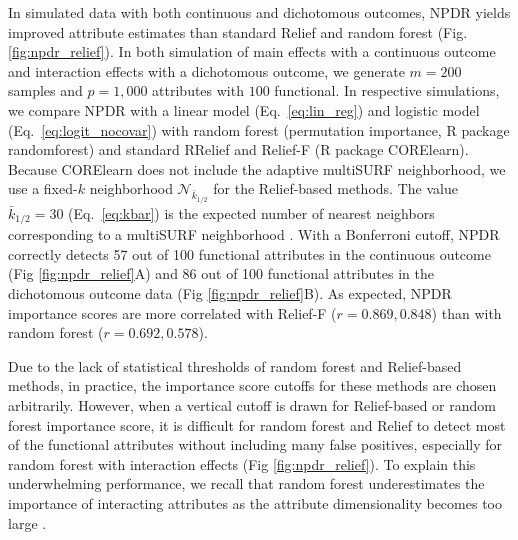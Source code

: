 \documentclass[10pt]{article}
\begin{document}
In simulated data with both continuous and dichotomous outcomes, NPDR yields improved attribute estimates than standard Relief and random forest (Fig. \ref{fig:npdr_relief}).
In both simulation of main effects with a continuous outcome and interaction effects with a dichotomous outcome, we generate $m = 200$ samples and $p = 1,000$ attributes with $100$ functional.
In respective simulations, we compare NPDR with a linear model (Eq.~\ref{eq:lin_reg}) and logistic model (Eq.~\ref{eq:logit_nocovar}) with random forest (permutation importance, R package randomforest) and standard RRelief and Relief-F (R package CORElearn).
Because CORElearn does not include the adaptive multiSURF neighborhood, we use a fixed-$k$ neighborhood $\mathcal{N}_{\bar{k}_{1/2}}$ for the Relief-based methods.
The value $\bar{k}_{1/2}=30$ (Eq.~\ref{eq:kbar}) is the expected number of nearest neighbors corresponding to a multiSURF neighborhood \cite{bod}. 
With a Bonferroni cutoff, NPDR correctly detects 57 out of 100 functional attributes in the continuous outcome (Fig \ref{fig:npdr_relief}A) and 86 out of 100 functional attributes in the dichotomous outcome data (Fig \ref{fig:npdr_relief}B).
As expected, NPDR importance scores are more correlated with Relief-F ($r = 0.869, 0.848$) than with random forest ($r = 0.692, 0.578$).

Due to the lack of statistical thresholds of random forest and Relief-based methods, in practice, the importance score cutoffs for these methods are chosen arbitrarily.
However, when a vertical cutoff is drawn for Relief-based or random forest importance score, it is difficult for random forest and Relief to detect most of the functional attributes without including many false positives, especially for random forest with interaction effects (Fig \ref{fig:npdr_relief}).
To explain this underwhelming performance, we recall that random forest underestimates the importance of interacting attributes as the attribute dimensionality becomes too large \cite{mckinney2009capturing,winham2012snp}.
\end{document}
